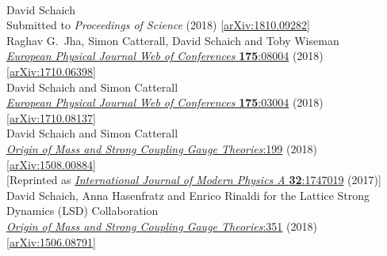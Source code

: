 \begin{spacelistout}
\begin{revnumerate}
\vspace{18 pt} \hspace{-22 pt}{\large \bfseries Conference proceedings} \vspace{-8 pt}
    \pagebreakitem
       \\
      David Schaich \\
      Submitted to \textit{Proceedings of Science} (2018) [\href{http://arxiv.org/abs/1810.09282}{arXiv:1810.09282}]
    \pagebreakitem
       \\
      Raghav G.~Jha, Simon Catterall, David Schaich and Toby Wiseman \\
      \href{https://doi.org/10.1051/epjconf/201817508004}{\textit{European Physical Journal Web of Conferences} \textbf{175}:08004} (2018) [\href{http://arxiv.org/abs/1710.06398}{arXiv:1710.06398}]
    \pagebreakitem
       \\
      David Schaich and Simon Catterall \\
      \href{https://doi.org/10.1051/epjconf/201817503004}{\textit{European Physical Journal Web of Conferences} \textbf{175}:03004} (2018) [\href{http://arxiv.org/abs/1710.08137}{arXiv:1710.08137}]
    \pagebreakitem
       \\
      David Schaich and Simon Catterall \\
      \href{http://dx.doi.org/10.1142/9789813231467_0028}{\textit{Origin of Mass and Strong Coupling Gauge Theories}:199} (2018) [\href{http://arxiv.org/abs/1508.00884}{arXiv:1508.00884}] \\
      {[Reprinted as \href{http://dx.doi.org/10.1142/S0217751X17470194}{\textit{International Journal of Modern Physics A} \textbf{32}:1747019} (2017)]}
    \pagebreakitem
       \\
      David Schaich, Anna Hasenfratz and Enrico Rinaldi for the Lattice Strong Dynamics (LSD) Collaboration \\
      \href{http://dx.doi.org/10.1142/9789813231467_0051}{\textit{Origin of Mass and Strong Coupling Gauge Theories}:351} (2018) [\href{http://arxiv.org/abs/1506.08791}{arXiv:1506.08791}]

\end{revnumerate}
\end{spacelistout}
